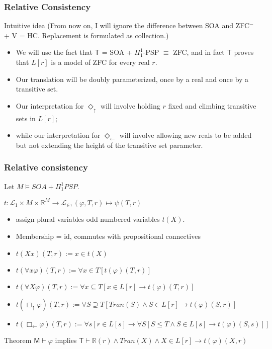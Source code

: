 \documentclass[handout]{beamer}
\newcommand{\du}{\Diamond_\uparrow}
\newcommand{\dl}{\Diamond_\leftarrow}
\newcommand{\bu}{\Box_\uparrow}
\newcommand{\bl}{\Box_\leftarrow}
\begin{document}
\begin{frame}
    \frametitle{Relative Consistency}
\begin{block}{Intuitive idea}
     (From now on, I will ignore the difference between SOA 
    and ZFC$^-$+ V = HC. Replacement is formulated as collection.)
    \begin{itemize}
    \item<3-> We will use the fact that $\mathsf{T}$ = SOA + $\Pi_1^1$-PSP 
    $\equiv$ ZFC, and in fact $\mathsf{T}$ proves that $L[r]$ is a 
    model of ZFC for every real $r$. 
    \item<4-> 
    Our translation will be doubly parameterized, once by a real and 
    once by a transitive set.
    \item<5->
    Our interpretation for $\du$ will involve holding $r$ fixed and 
    climbing transitive sets in $L[r]$;
    \item<6-> 
    while our interpretation for $\dl$ will involve allowing new reals 
    to be added but not extending the height of the transitive set parameter.
    \end{itemize}
\end{block}
\end{frame}
\begin{frame}
    \frametitle{Relative consistency}
     Let $M \vDash SOA + \Pi_1^1 PSP$.
    \begin{block}{$t : \mathcal{L}_1 \times M \times \mathbb{R}^M \to \mathcal{L}_\in, (\varphi, T, r) \mapsto \psi(T, r)$}
        \begin{itemize}
            \item<4-> assign plural variables odd numbered variables $t(X)$.
            \item<5-> Membership = id, commutes with propositional connectives 
            \item<6-> $t(Xx)(T, r) := x \in t(X)$
            \item<7-> $t(\forall x \varphi)(T, r) := \forall x \in T [t(\varphi)(T, r)]$
            \item<8-> $t(\forall X \varphi)(T, r) := \forall x \subseteq T [x \in L[r] \rightarrow t(\varphi)(T, r)]$
            \item<9-> $t(\bu \varphi)(T, r) := \forall S \supseteq T [Tran(S) \wedge S \in L[r] \rightarrow t(\varphi)(S, r)]$
            \item<10-> $t(\bl \varphi)(T, r) := \forall s[ r \in L[s] \rightarrow \forall S[ S \leq T \wedge S \in L[s] \rightarrow t(\varphi)(S, s)]]$
        \end{itemize}
    \end{block}
\begin{block}{Theorem}
  $\mathsf{M} \vdash \varphi$ implies $\mathsf{T} \vdash \mathbb{R}(r) \wedge Tran(X) \wedge X \in L[r] \rightarrow t(\varphi)(X, r)$  
\end{block}
\end{frame}
\end{document}
